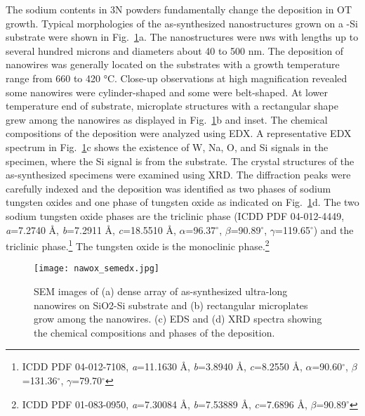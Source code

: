 The sodium contents in 3N powders fundamentally change the deposition in OT growth. Typical morphologies of the as-synthesized nanostructures grown on a -Si substrate were shown in Fig.~\ref{fig:nawoxsemedx}a. The nanostructures were \glspl{nw} with lengths up to several hundred microns and diameters about 40 to 500 nm. The deposition of nanowires was generally located on the substrates with a growth temperature range from 660 to 420 \si{\degreeCelsius}. Close-up observations at high magnification revealed some nanowires were cylinder-shaped and some were belt-shaped. At lower temperature end of substrate, microplate structures with a rectangular shape grew among the nanowires as displayed in Fig.~\ref{fig:nawoxsemedx}b and inset. The chemical compositions of the deposition were analyzed using EDX. A representative EDX spectrum in Fig.~\ref{fig:nawoxsemedx}c shows the existence of W, Na, O, and Si signals in the specimen, where the Si signal is from the substrate. The crystal structures of the as-synthesized specimens were examined using XRD. The diffraction peaks were carefully indexed and the deposition was identified as two phases of sodium tungsten oxides and one phase of tungsten oxide as indicated on Fig.~\ref{fig:nawoxsemedx}d. The two sodium tungsten oxide phases are the triclinic  phase (ICDD PDF 04-012-4449, \emph{a}=7.2740 \AA, \emph{b}=7.2911 \AA, \emph{c}=18.5510 \AA, $\alpha$=96.37$^\circ$, $\beta$=90.89$^\circ$, $\gamma$=119.65$^\circ$) and the triclinic  phase.\footnote{ICDD PDF 04-012-7108, \emph{a}=11.1630 \AA, \emph{b}=3.8940 \AA, \emph{c}=8.2550 \AA, $\alpha$=90.60$^\circ$, $\beta$=131.36$^\circ$, $\gamma$=79.70$^\circ$} The tungsten oxide is the monoclinic  phase.\footnote{ICDD PDF 01-083-0950, \emph{a}=7.30084 \AA, \emph{b}=7.53889 \AA, \emph{c}=7.6896 \AA, $\beta$=90.89$^\circ$}

\begin{figure}[htb]
\centering
\texttt{[image: nawox\_semedx.jpg]}
\caption[SEM and EDX on ]{SEM images of (a) dense array of as-synthesized ultra-long nanowires on SiO2-Si substrate and (b) rectangular microplates grow among the nanowires. (c) EDS and (d) XRD spectra showing the chemical compositions and phases of the deposition.}
\label{fig:nawoxsemedx}
\end{figure}


